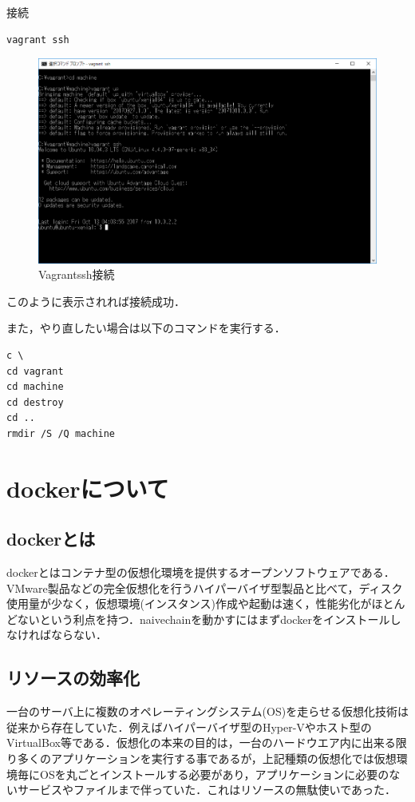 \newpage

接続
\begin{verbatim}
vagrant ssh
\end{verbatim}

\begin{figure}[h]
\centering
\includegraphics[width=12cm]{vagrantssh.PNG}
\caption{Vagrantssh接続}\label{サンプル図}
\end{figure}

このように表示されれば接続成功．

また，やり直したい場合は以下のコマンドを実行する．
\begin{verbatim}
c \
cd vagrant
cd machine
cd destroy
cd ..
rmdir /S /Q machine
\end{verbatim}

\newpage



\section{dockerについて}
\subsection{dockerとは}
dockerとはコンテナ型の仮想化環境を提供するオープンソフトウェアである．VMware製品などの完全仮想化を行うハイパーバイザ型製品と比べて，ディスク使用量が少なく，仮想環境(インスタンス)作成や起動は速く，性能劣化がほとんどないという利点を持つ．naivechainを動かすにはまずdockerをインストールしなければならない．

\subsection{リソースの効率化}
一台のサーバ上に複数のオペレーティングシステム(OS)を走らせる仮想化技術は従来から存在していた．例えばハイパーバイザ型のHyper-Vやホスト型のVirtualBox等である．仮想化の本来の目的は，一台のハードウエア内に出来る限り多くのアプリケーションを実行する事であるが，上記種類の仮想化では仮想環境毎にOSを丸ごとインストールする必要があり，アプリケーションに必要のないサービスやファイルまで伴っていた．これはリソースの無駄使いであった．

